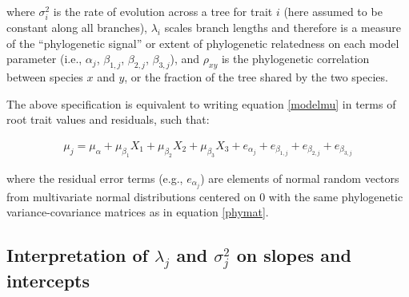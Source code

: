 \documentclass{article}\usepackage[]{graphicx}\usepackage[]{color}
\begin{document}
\noindent where $\sigma_i^2$ is the rate of evolution across a tree for trait $i$ (here assumed to be constant along all branches), $\lambda_i$ scales branch lengths and therefore is a measure of the ``phylogenetic signal'' or extent of phylogenetic relatedness on each model parameter (i.e., $\alpha_{j}$, $\beta_{1,j}$, $\beta_{2,j}$, $\beta_{3,j}$), and $\rho_{xy}$ is the phylogenetic correlation between species $x$ and $y$, or the fraction of the tree shared by the two species.

The above specification is equivalent to writing equation \ref{modelmu} in terms of root trait values and residuals, such that:

\begin{align}
  \label{eqfive}
  \mu_j = \mu_\alpha + \mu_{\beta_1} X_1 + \mu_{\beta_2} X_2 + \mu_{\beta_3} X_3 + e_{\alpha_{j}} + e_{\beta_{1,j}} + e_{\beta_{2,j}} + e_{\beta_{3,j}}
\end{align}

\noindent where the residual error terms (e.g., $e_{\alpha_{j}}$) are elements of normal random vectors from multivariate normal distributions centered on $0$ with the same phylogenetic variance-covariance matrices as in equation \ref{phymat}.




\subsection*{Interpretation of $\lambda_j$ and $\sigma_j^2$ on slopes and intercepts}
\end{document}
